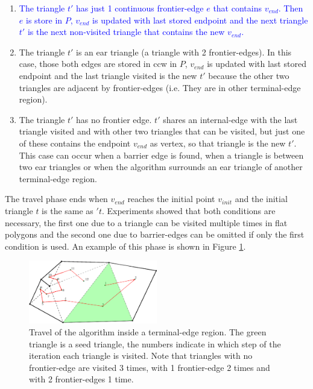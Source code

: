 \documentclass[pdflatex,sn-mathphys]{sn-jnl}%
\theoremstyle{thmstyleone}%
\theoremstyle{thmstyletwo}%
\theoremstyle{thmstylethree}%
\begin{document}
\begin{enumerate}[label=\roman*)]
    \item \textcolor{blue}{ The triangle $t'$ has just 1 continuous frontier-edge $e$ that contains $v_{end}$. Then $e$ is store in $P$, $v_{end}$ is updated with last stored endpoint and the next triangle $t'$ is the next non-visited triangle that contains the new $v_{end}$.} %
    
    \item The triangle $t'$ is an ear triangle (a triangle with 2 frontier-edges). In this case, those both edges are stored in ccw in $P$, $v_{end}$ is updated with last stored endpoint and the last triangle visited is the new $t'$ because the other two triangles are adjacent by frontier-edges (i.e. They are in other terminal-edge region).
    
    \item The triangle $t'$ has no frontier edge. $t'$ shares an internal-edge with the last triangle visited and with other two triangles that can be visited, but just one of these contains the endpoint $v_{end}$ as vertex, so that triangle is the new $t'$. This case can occur when a barrier edge is found, when a triangle is between two ear triangles or when the algorithm surrounds an ear triangle of another terminal-edge region.
\end{enumerate}

The travel phase ends when $v_{end}$ reaches the initial point $v_{init}$ and the initial triangle $t$ is the same as $'t$. Experiments showed that both conditions are necessary, the first one due to a triangle can be visited multiple times in flat polygons and the second one due to barrier-edges can be omitted if only the first condition is used. An example of this phase is shown in Figure \ref{fig:travelphase}.

\begin{figure}[h]
    \centering
\includegraphics[width=0.5\textwidth]{travelphase2.eps}

    \caption{Travel of the algorithm inside a terminal-edge region. The green triangle is a seed triangle, the numbers indicate in which step of the iteration each triangle is visited. Note that triangles with no frontier-edge are visited 3 times, with 1 frontier-edge 2 times and with 2 frontier-edges 1 time.} 
    \label{fig:travelphase}
\end{figure}
\end{document}
